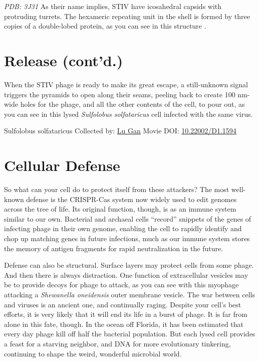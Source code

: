 \documentclass[]{tufte-book}
\begin{document}
\emph{PDB: 3J31}
As their name implies, STIV have icosahedral capsids with protruding turrets. The hexameric repeating unit in the shell is formed by three copies of a double-lobed protein, as you can see in this structure \citep{veesler2013}.

\hypertarget{release-contd.}{%
\section{Release (cont'd.)}\label{release-contd.}}

When the STIV phage is ready to make its great escape, a still-unknown signal triggers the pyramids to open along their seams, peeling back to create 100 nm-wide holes for the phage, and all the other contents of the cell, to pour out, as you can see in this lysed \emph{Sulfolobus solfataricus} cell infected with the same virus.



\hypertarget{htmlwidget-87836c46bf38f40c5974}{}

\label{fig:10-9}Sulfolobus solfataricus Collected by: \protect\hyperlink{lu_gan}{Lu Gan} Movie DOI: \href{https://doi.org/10.22002/D1.1594}{10.22002/D1.1594}

\hypertarget{cellular-defense}{%
\section{Cellular Defense}\label{cellular-defense}}

So what can your cell do to protect itself from these attackers? The most well-known defense is the CRISPR-Cas system now widely used to edit genomes across the tree of life. Its original function, though, is as an immune system similar to our own. Bacterial and archaeal cells ``record'' snippets of the genes of infecting phage in their own genome, enabling the cell to rapidly identify and chop up matching genes in future infections, much as our immune system stores the memory of antigen fragments for rapid neutralization in the future.

Defense can also be structural. Surface layers may protect cells from some phage. And then there is always distraction. One function of extracellular vesicles may be to provide decoys for phage to attack, as you can see with this myophage attacking a \emph{Shewanella oneidensis} outer membrane vesicle. The war between cells and viruses is an ancient one, and continually raging. Despite your cell's best efforts, it is very likely that it will end its life in a burst of phage. It is far from alone in this fate, though. In the ocean off Florida, it has been estimated that every day phage kill off half the bacterial population. But each lysed cell provides a feast for a starving neighbor, and DNA for more evolutionary tinkering, continuing to shape the weird, wonderful microbial world.
\end{document}
